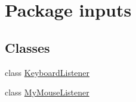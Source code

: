 \hypertarget{namespaceinputs}{}\section{Package inputs}
\label{namespaceinputs}
\subsection*{Classes}
\begin{DoxyCompactItemize}
\item 
class \hyperlink{classinputs_1_1_keyboard_listener}{Keyboard\+Listener}
\item 
class \hyperlink{classinputs_1_1_my_mouse_listener}{My\+Mouse\+Listener}
\end{DoxyCompactItemize}
